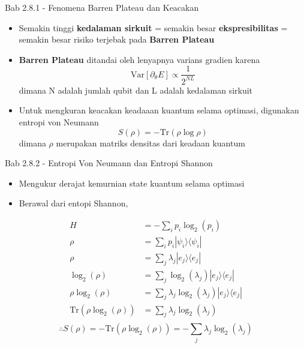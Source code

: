 \begin{frame}{Bab 2.8.1 - Fenomena Barren Plateau dan Keacakan}
    \begin{itemize}
        \item Semakin tinggi \textbf{kedalaman sirkuit} = semakin besar \textbf{ekspresibilitas} = semakin besar risiko terjebak pada \textbf{Barren Plateau}
        \item \textbf{Barren Plateau} ditandai oleh lenyapnya varians gradien karena  
        \begin{equation}
            \text{Var}[\partial_{\theta} E] \propto \frac{1}{2^{NL}}
        \end{equation}
        dimana N adalah jumlah qubit dan L adalah kedalaman sirkuit
        \item Untuk mengkuran keacakan keadaaan kuantum selama optimasi, digunakan entropi von Neumann
        \begin{equation}
            S(\rho) = -\text{Tr}(\rho \log \rho)
        \end{equation}
        dimana $\rho$ merupakan matriks densitas dari keadaan kuantum
    \end{itemize}
\end{frame}

\begin{frame}{Bab 2.8.2 - Entropi Von Neumann dan Entropi Shannon}
    \begin{itemize}
        \item Mengukur derajat kemurnian state kuantum selama optimasi
        \item Berawal dari entopi Shannon, 
    \end{itemize}
    {\scriptsize
    \begin{equation*}
        \begin{split}
            H &= - \sum_i p_i \log_2 (p_i) \\
            \rho &= \sum_i p_i |\psi_i\rangle \langle \psi_i| \\
            \rho &= \sum_j \lambda_j |e_j\rangle \langle e_j| \\
            \log_2(\rho) &= \sum_j \log_2 (\lambda_j) |e_j\rangle \langle e_j| \\
            \rho \log_2(\rho) &= \sum_j \lambda_j \log_2(\lambda_j) |e_j\rangle \langle e_j| \\
            \text{Tr}(\rho \log_2(\rho)) &= \sum_j \lambda_j \log_2(\lambda_j) \\
        \end{split}
    \end{equation*}
    \begin{equation}
        \therefore S(\rho) = -\text{Tr}(\rho \log_2(\rho)) = -\sum_j \lambda_j \log_2 (\lambda_j)
    \end{equation}
    }
\end{frame}
